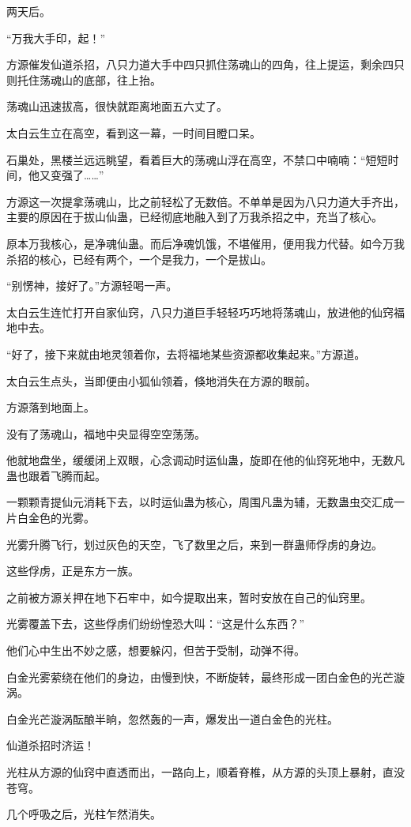 \begin{this_body}
两天后。

“万我大手印，起！”

方源催发仙道杀招，八只力道大手中四只抓住荡魂山的四角，往上提运，剩余四只则托住荡魂山的底部，往上抬。

荡魂山迅速拔高，很快就距离地面五六丈了。

太白云生立在高空，看到这一幕，一时间目瞪口呆。

石巢处，黑楼兰远远眺望，看着巨大的荡魂山浮在高空，不禁口中喃喃：“短短时间，他又变强了……”

方源这一次提拿荡魂山，比之前轻松了无数倍。不单单是因为八只力道大手齐出，主要的原因在于拔山仙蛊，已经彻底地融入到了万我杀招之中，充当了核心。

原本万我核心，是净魂仙蛊。而后净魂饥饿，不堪催用，便用我力代替。如今万我杀招的核心，已经有两个，一个是我力，一个是拔山。

“别愣神，接好了。”方源轻喝一声。

太白云生连忙打开自家仙窍，八只力道巨手轻轻巧巧地将荡魂山，放进他的仙窍福地中去。

“好了，接下来就由地灵领着你，去将福地某些资源都收集起来。”方源道。

太白云生点头，当即便由小狐仙领着，倏地消失在方源的眼前。

方源落到地面上。

没有了荡魂山，福地中央显得空空荡荡。

他就地盘坐，缓缓闭上双眼，心念调动时运仙蛊，旋即在他的仙窍死地中，无数凡蛊也跟着飞腾而起。

一颗颗青提仙元消耗下去，以时运仙蛊为核心，周围凡蛊为辅，无数蛊虫交汇成一片白金色的光雾。

光雾升腾飞行，划过灰色的天空，飞了数里之后，来到一群蛊师俘虏的身边。

这些俘虏，正是东方一族。

之前被方源关押在地下石牢中，如今提取出来，暂时安放在自己的仙窍里。

光雾覆盖下去，这些俘虏们纷纷惶恐大叫：“这是什么东西？”

他们心中生出不妙之感，想要躲闪，但苦于受制，动弹不得。

白金光雾萦绕在他们的身边，由慢到快，不断旋转，最终形成一团白金色的光芒漩涡。

白金光芒漩涡酝酿半晌，忽然轰的一声，爆发出一道白金色的光柱。

仙道杀招时济运！

光柱从方源的仙窍中直透而出，一路向上，顺着脊椎，从方源的头顶上暴射，直没苍穹。

几个呼吸之后，光柱乍然消失。


\end{this_body}
